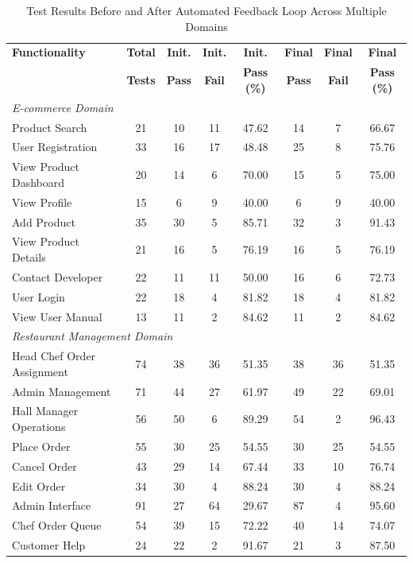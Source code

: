 \begin{table}[t]
\centering
\caption{Test Results Before and After Automated Feedback Loop Across Multiple Domains}
\label{tab:combined-test-results}
\tiny
\begin{tabular}{lccccccc}
\toprule
\textbf{Functionality} & \textbf{Total} & \textbf{Init.} & \textbf{Init.} & \textbf{Init.} & \textbf{Final} & \textbf{Final} & \textbf{Final} \\
 & \textbf{Tests} & \textbf{Pass} & \textbf{Fail} & \textbf{Pass (\%)} & \textbf{Pass} & \textbf{Fail} & \textbf{Pass (\%)} \\
\midrule
\multicolumn{8}{l}{\textit{E-commerce Domain}} \\
Product Search & 21 & 10 & 11 & 47.62 & 14 & 7 & 66.67 \\
User Registration & 33 & 16 & 17 & 48.48 & 25 & 8 & 75.76 \\
View Product Dashboard & 20 & 14 & 6 & 70.00 & 15 & 5 & 75.00 \\
View Profile & 15 & 6 & 9 & 40.00 & 6 & 9 & 40.00 \\
Add Product & 35 & 30 & 5 & 85.71 & 32 & 3 & 91.43 \\
View Product Details & 21 & 16 & 5 & 76.19 & 16 & 5 & 76.19 \\
Contact Developer & 22 & 11 & 11 & 50.00 & 16 & 6 & 72.73 \\
User Login & 22 & 18 & 4 & 81.82 & 18 & 4 & 81.82 \\
View User Manual & 13 & 11 & 2 & 84.62 & 11 & 2 & 84.62 \\
\midrule
\multicolumn{8}{l}{\textit{Restaurant Management Domain}} \\
Head Chef Order Assignment & 74 & 38 & 36 & 51.35 & 38 & 36 & 51.35 \\
Admin Management & 71 & 44 & 27 & 61.97 & 49 & 22 & 69.01 \\
Hall Manager Operations & 56 & 50 & 6 & 89.29 & 54 & 2 & 96.43 \\
Place Order & 55 & 30 & 25 & 54.55 & 30 & 25 & 54.55 \\
Cancel Order & 43 & 29 & 14 & 67.44 & 33 & 10 & 76.74 \\
Edit Order & 34 & 30 & 4 & 88.24 & 30 & 4 & 88.24 \\
Admin Interface & 91 & 27 & 64 & 29.67 & 87 & 4 & 95.60 \\
Chef Order Queue & 54 & 39 & 15 & 72.22 & 40 & 14 & 74.07 \\
Customer Help & 24 & 22 & 2 & 91.67 & 21 & 3 & 87.50 \\

\end{tabular}
\end{table}
